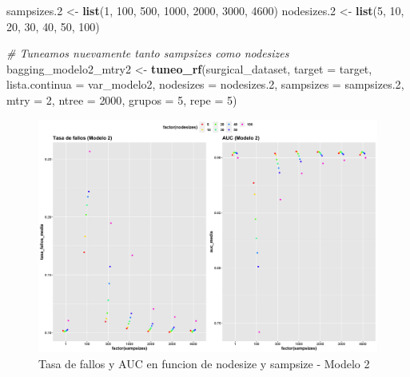 \documentclass[
]{article}
\newenvironment{Shaded}{\begin{snugshade}}{\end{snugshade}}
\newcommand{\CommentTok}[1]{\textcolor[rgb]{0.56,0.35,0.01}{\textit{#1}}}
\newcommand{\DataTypeTok}[1]{\textcolor[rgb]{0.13,0.29,0.53}{#1}}
\newcommand{\DecValTok}[1]{\textcolor[rgb]{0.00,0.00,0.81}{#1}}
\newcommand{\FloatTok}[1]{\textcolor[rgb]{0.00,0.00,0.81}{#1}}
\newcommand{\KeywordTok}[1]{\textcolor[rgb]{0.13,0.29,0.53}{\textbf{#1}}}
\newcommand{\NormalTok}[1]{#1}
\newcommand{\StringTok}[1]{\textcolor[rgb]{0.31,0.60,0.02}{#1}}
\begin{document}
\begin{Shaded}
\begin{Highlighting}[]
\NormalTok{sampsizes}\FloatTok{.2}\NormalTok{ <{-}}\StringTok{ }\KeywordTok{list}\NormalTok{(}\DecValTok{1}\NormalTok{, }\DecValTok{100}\NormalTok{, }\DecValTok{500}\NormalTok{, }\DecValTok{1000}\NormalTok{, }\DecValTok{2000}\NormalTok{, }\DecValTok{3000}\NormalTok{, }\DecValTok{4600}\NormalTok{)}
\NormalTok{nodesizes}\FloatTok{.2}\NormalTok{ <{-}}\StringTok{ }\KeywordTok{list}\NormalTok{(}\DecValTok{5}\NormalTok{, }\DecValTok{10}\NormalTok{, }\DecValTok{20}\NormalTok{, }\DecValTok{30}\NormalTok{, }\DecValTok{40}\NormalTok{, }\DecValTok{50}\NormalTok{, }\DecValTok{100}\NormalTok{)}

\CommentTok{\# Tuneamos nuevamente tanto sampsizes como nodesizes}
\NormalTok{bagging\_modelo2\_mtry2 <{-}}\StringTok{  }\KeywordTok{tuneo\_rf}\NormalTok{(surgical\_dataset, }\DataTypeTok{target =}\NormalTok{ target,}
                                   \DataTypeTok{lista.continua =}\NormalTok{ var\_modelo2,}
                                   \DataTypeTok{nodesizes =}\NormalTok{ nodesizes}\FloatTok{.2}\NormalTok{,}
                                   \DataTypeTok{sampsizes =}\NormalTok{ sampsizes}\FloatTok{.2}\NormalTok{, }\DataTypeTok{mtry =} \DecValTok{2}\NormalTok{,}
                                   \DataTypeTok{ntree =} \DecValTok{2000}\NormalTok{, }\DataTypeTok{grupos =} \DecValTok{5}\NormalTok{, }\DataTypeTok{repe =} \DecValTok{5}\NormalTok{)}
\end{Highlighting}
\end{Shaded}

\begin{figure}[h!]

{\centering \includegraphics[width=0.99\linewidth,height=0.99\textheight,]{./charts/random_forest/04_comp_tasa_auc_modelo2} 

}

\caption{Tasa de fallos y AUC en funcion de nodesize y sampsize - Modelo 2}\label{fig:unnamed-chunk-96}
\end{figure}
\end{document}
